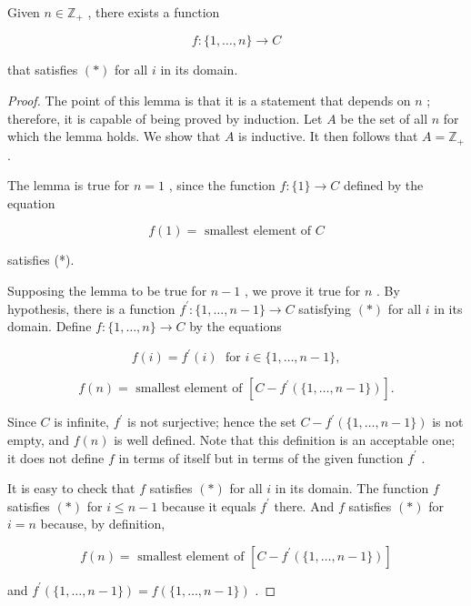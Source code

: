 \begin{lemma} Given \(n \in  {\mathbb{Z}}_{ + }\) , there exists a function

\[
f : \{ 1,\ldots ,n\}  \rightarrow  C
\]

that satisfies \(\left( *\right)\) for all \(i\) in its domain.
\end{lemma}
\begin{proof} The point of this lemma is that it is a statement that depends on \(n\) ; therefore, it is capable of being proved by induction. Let \(A\) be the set of all \(n\) for which the lemma holds. We show that \(A\) is inductive. It then follows that \(A = {\mathbb{Z}}_{ + }\) .

The lemma is true for \(n = 1\) , since the function \(f : \{ 1\}  \rightarrow  C\) defined by the equation

\[
f\left( 1\right)  = \text{ smallest element of }C
\]

satisfies (*).

Supposing the lemma to be true for \(n - 1\) , we prove it true for \(n\) . By hypothesis, there is a function \({f}^{\prime } : \{ 1,\ldots ,n - 1\}  \rightarrow  C\) satisfying \(\left( *\right)\) for all \(i\) in its domain. Define \(f : \{ 1,\ldots ,n\}  \rightarrow  C\) by the equations

\[
f\left( i\right)  = {f}^{\prime }\left( i\right) \;\text{ for }i \in  \{ 1,\ldots ,n - 1\} ,
\]

\[
f\left( n\right)  = \text{ smallest element of }\left\lbrack  {C - {f}^{\prime }\left( {\{ 1,\ldots ,n - 1\} }\right) }\right\rbrack  .
\]

Since \(C\) is infinite, \({f}^{\prime }\) is not surjective; hence the set \(C - {f}^{\prime }\left( {\{ 1,\ldots ,n - 1\} }\right)\) is not empty, and \(f\left( n\right)\) is well defined. Note that this definition is an acceptable one; it does not define \(f\) in terms of itself but in terms of the given function \({f}^{\prime }\) .

It is easy to check that \(f\) satisfies \(\left( *\right)\) for all \(i\) in its domain. The function \(f\) satisfies \(\left( *\right)\) for \(i \leq  n - 1\) because it equals \({f}^{\prime }\) there. And \(f\) satisfies \(\left( *\right)\) for \(i = n\) because, by definition,

\[
f\left( n\right)  = \text{ smallest element of }\left\lbrack  {C - {f}^{\prime }\left( {\{ 1,\ldots ,n - 1\} }\right) }\right\rbrack
\]

and \({f}^{\prime }\left( {\{ 1,\ldots ,n - 1\} }\right)  = f\left( {\{ 1,\ldots ,n - 1\} }\right)\) .
\end{proof}

